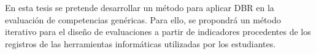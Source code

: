 En esta tesis se pretende desarrollar un método para aplicar DBR en la evaluación de competencias genéricas. Para ello, se propondrá un método iterativo para el diseño de evaluaciones a partir de indicadores procedentes de los registros de las herramientas informáticas utilizadas por los estudiantes.



